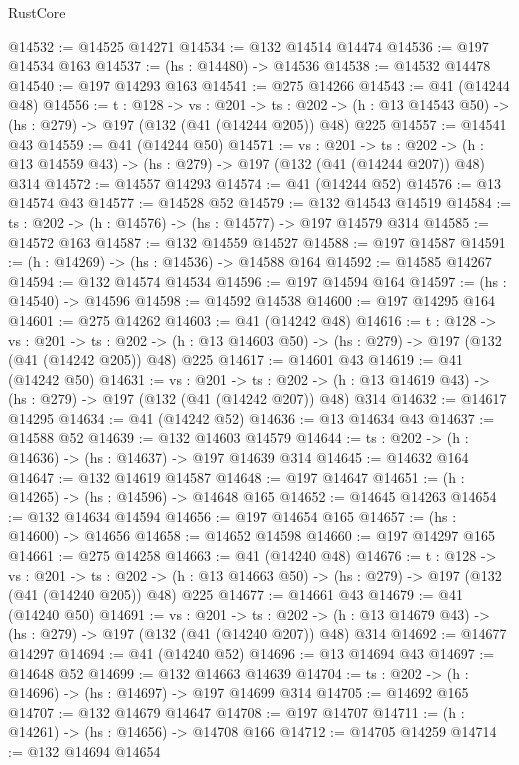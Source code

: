 \begin{lexlean}{RustCore}
\begin{coremodule}
@14532 := @14525 @14271
@14534 := @132 @14514 @14474
@14536 := @197 @14534 @163
@14537 := (hs : @14480) -> @14536
@14538 := @14532 @14478
@14540 := @197 @14293 @163
@14541 := @275 @14266
@14543 := @41 (@14244 @48)
@14556 := {t : @128} ->
  {vs : @201} ->
  {ts : @202} -> (h : @13 @14543 @50) -> (hs : @279) -> @197 (@132 (@41 (@14244 @205)) @48) @225
@14557 := @14541 @43
@14559 := @41 (@14244 @50)
@14571 := {vs : @201} ->
  {ts : @202} -> (h : @13 @14559 @43) -> (hs : @279) -> @197 (@132 (@41 (@14244 @207)) @48) @314
@14572 := @14557 @14293
@14574 := @41 (@14244 @52)
@14576 := @13 @14574 @43
@14577 := @14528 @52
@14579 := @132 @14543 @14519
@14584 := {ts : @202} -> (h : @14576) -> (hs : @14577) -> @197 @14579 @314
@14585 := @14572 @163
@14587 := @132 @14559 @14527
@14588 := @197 @14587
@14591 := (h : @14269) -> (hs : @14536) -> @14588 @164
@14592 := @14585 @14267
@14594 := @132 @14574 @14534
@14596 := @197 @14594 @164
@14597 := (hs : @14540) -> @14596
@14598 := @14592 @14538
@14600 := @197 @14295 @164
@14601 := @275 @14262
@14603 := @41 (@14242 @48)
@14616 := {t : @128} ->
  {vs : @201} ->
  {ts : @202} -> (h : @13 @14603 @50) -> (hs : @279) -> @197 (@132 (@41 (@14242 @205)) @48) @225
@14617 := @14601 @43
@14619 := @41 (@14242 @50)
@14631 := {vs : @201} ->
  {ts : @202} -> (h : @13 @14619 @43) -> (hs : @279) -> @197 (@132 (@41 (@14242 @207)) @48) @314
@14632 := @14617 @14295
@14634 := @41 (@14242 @52)
@14636 := @13 @14634 @43
@14637 := @14588 @52
@14639 := @132 @14603 @14579
@14644 := {ts : @202} -> (h : @14636) -> (hs : @14637) -> @197 @14639 @314
@14645 := @14632 @164
@14647 := @132 @14619 @14587
@14648 := @197 @14647
@14651 := (h : @14265) -> (hs : @14596) -> @14648 @165
@14652 := @14645 @14263
@14654 := @132 @14634 @14594
@14656 := @197 @14654 @165
@14657 := (hs : @14600) -> @14656
@14658 := @14652 @14598
@14660 := @197 @14297 @165
@14661 := @275 @14258
@14663 := @41 (@14240 @48)
@14676 := {t : @128} ->
  {vs : @201} ->
  {ts : @202} -> (h : @13 @14663 @50) -> (hs : @279) -> @197 (@132 (@41 (@14240 @205)) @48) @225
@14677 := @14661 @43
@14679 := @41 (@14240 @50)
@14691 := {vs : @201} ->
  {ts : @202} -> (h : @13 @14679 @43) -> (hs : @279) -> @197 (@132 (@41 (@14240 @207)) @48) @314
@14692 := @14677 @14297
@14694 := @41 (@14240 @52)
@14696 := @13 @14694 @43
@14697 := @14648 @52
@14699 := @132 @14663 @14639
@14704 := {ts : @202} -> (h : @14696) -> (hs : @14697) -> @197 @14699 @314
@14705 := @14692 @165
@14707 := @132 @14679 @14647
@14708 := @197 @14707
@14711 := (h : @14261) -> (hs : @14656) -> @14708 @166
@14712 := @14705 @14259
@14714 := @132 @14694 @14654

\end{coremodule}
\end{lexlean}
